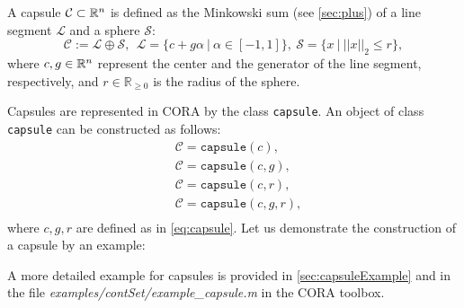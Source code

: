  \label{sec:capsules}

A capsule $\mathcal{C} \subset \mathbb{R}^n$ is defined as the Minkowski sum (see \cref{sec:plus}) of a line segment $\mathcal{L}$ and a sphere $\mathcal{S}$:
\begin{equation} \label{eq:capsule}
	\mathcal{C} := \mathcal{L} \oplus \mathcal{S}, ~~ \mathcal{L} = \{c + g \alpha~|~ \alpha \in [-1,1]\}, ~ \mathcal{S} = \{ x~|~ ||x||_2 \leq r \},
\end{equation}
where $c,g \in \mathbb{R}^n$ represent the center and the generator of the line segment, respectively, and $r \in \mathbb{R}_{\geq 0}$ is the radius of the sphere.

Capsules are represented in CORA by the class \texttt{capsule}. An object of class \texttt{capsule} can be constructed as follows:
\begin{equation*}
	\begin{split}
		& \mathcal{C} = \texttt{capsule}(c), \\
		& \mathcal{C} = \texttt{capsule}(c,g), \\
		& \mathcal{C} = \texttt{capsule}(c,r), \\
		& \mathcal{C} = \texttt{capsule}(c,g,r), \\
	\end{split}
\end{equation*} 
where $c,g,r$ are defined as in \eqref{eq:capsule}. Let us demonstrate the construction of a capsule by an example:

\begin{center}
\begin{minipage}[t]{0.35\textwidth}
	\vspace{30pt}
	\footnotesize
	
\end{minipage}
\begin{minipage}[t]{0.3\textwidth}
	\vspace{0pt}
	\centering
\end{minipage}
\end{center}

A more detailed example for capsules is provided in \cref{sec:capsuleExample} and in the file \textit{examples/contSet/example\_capsule.m} in the CORA toolbox.